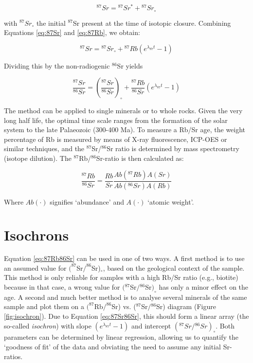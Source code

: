 \documentclass{book}
\begin{document}
\begin{equation}
^{87}Sr = {}^{87}Sr^* + {}^{87}Sr_\circ
\label{eq:87Sr}
\end{equation}

with $^{87}Sr_\circ$ the initial $^{87}$Sr present at the time of
isotopic closure.  Combining Equations \ref{eq:87Sr} and
\ref{eq:87Rb}, we obtain:

\begin{equation}
^{87}Sr = {}^{87}Sr_\circ + {}^{87}Rb (e^{\lambda_{87} t} - 1)
\label{eq:87Sr2}
\end{equation}

Dividing this by the non-radiogenic $^{86}$Sr yields

\begin{equation}
\frac{^{87}Sr}{^{86}Sr} =
\left(\frac{^{87}Sr}{^{86}Sr}\right)_\circ +
\frac{^{87}Rb}{^{86}Sr} (e^{\lambda_{87} t} - 1)
\label{eq:87Sr86Sr}
\end{equation}

The method can be applied to single minerals or to whole rocks.  Given
the very long half life, the optimal time scale ranges from the
formation of the solar system to the late Palaeozoic (300-400 Ma).  To
measure a Rb/Sr age, the weight percentage of Rb is measured by means
of X-ray fluorescence, ICP-OES or similar techniques, and the
$^{87}$Sr/$^{86}$Sr ratio is determined by mass spectrometry (isotope
dilution). The $^{87}$Rb/$^{86}$Sr-ratio is then calculated as:

\begin{equation}
\frac{^{87}Rb}{^{86}Sr} =
\frac{Rb}{Sr} \frac{Ab(^{87}Rb)
  A(Sr)}{Ab(^{86}Sr) A(Rb)}
\label{eq:87Rb86Sr}
\end{equation}

Where $Ab(\cdot)$ signifies `abundance' and $A(\cdot)$ `atomic weight'.

\section{Isochrons}
\label{sec:isochrons}

Equation \ref{eq:87Rb86Sr} can be used in one of two ways. A first
method is to use an assumed value for $(^{87}$Sr$/^{86}$Sr)$_\circ$,
based on the geological context of the sample. This method is only
reliable for samples with a high Rb/Sr ratio (e.g., biotite) because
in that case, a wrong value for $({}^{87}$Sr$/{}^{86}$Sr$)_\circ$ has
only a minor effect on the age. A second and much better method is to
analyse several minerals of the same sample and plot them on a
$(^{87}$Rb$/^{86}$Sr) vs.  (${}^{87}$Sr$/{}^{86}$Sr) diagram (Figure
\ref{fig:isochron}).  Due to Equation \ref{eq:87Sr86Sr}, this should
form a linear array (the so-called \emph{isochron}) with slope
$(e^{\lambda_{87} t} - 1)$ and intercept
$({}^{87}Sr/{}^{86}Sr)_\circ$.  Both parameters can be determined
by linear regression, allowing us to quantify the `goodness of fit' of
the data and obviating the need to assume any initial Sr-ratios.
\end{document}
